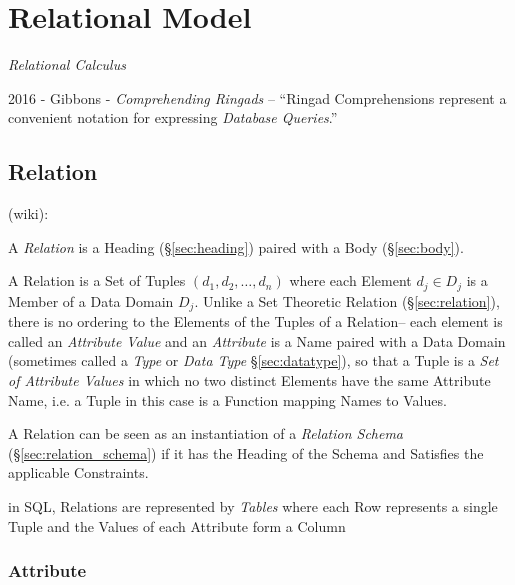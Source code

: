 \section{Relational Model}\label{sec:relational_model}

\emph{Relational Calculus}


2016 - Gibbons - \emph{Comprehending Ringads} -- ``Ringad Comprehensions
represent a convenient notation for expressing \emph{Database Queries}.''



\subsection{Relation}\label{sec:database_relation}

(wiki):

A \emph{Relation} is a Heading (\S\ref{sec:heading}) paired with a Body
(\S\ref{sec:body}).

A Relation is a Set of Tuples $(d_1, d_2, \ldots, d_n)$ where each Element $d_j
\in D_j$ is a Member of a Data Domain $D_j$. Unlike a Set Theoretic Relation
(\S\ref{sec:relation}), there is no ordering to the Elements of the Tuples of a
Relation-- each element is called an \emph{Attribute Value} and an
\emph{Attribute} is a Name paired with a Data Domain (sometimes called a
\emph{Type} or \emph{Data Type} \S\ref{sec:datatype}), so that a Tuple is a
\emph{Set of Attribute Values} in which no two distinct Elements have the same
Attribute Name, i.e. a Tuple in this case is a Function mapping Names to
Values.

A Relation can be seen as an instantiation of a \emph{Relation Schema}
(\S\ref{sec:relation_schema}) if it has the Heading of the Schema and Satisfies
the applicable Constraints.

in SQL, Relations are represented by \emph{Tables} where each Row represents a
single Tuple and the Values of each Attribute form a Column



\subsubsection{Attribute}\label{sec:database_attribute}

